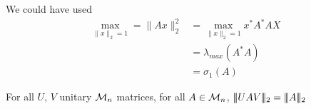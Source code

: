 \documentclass[aspectratio=169]{beamer}
\begin{document}
\begin{frame}
We could have used 
\begin{align*}
\max_{\|x\|_2=1}=\|Ax\|_2^2&= \max_{\|x\|_2=1}x^*A^*AX\\
&= \lambda_{max}(A^*A)\\
&= \sigma_1(A)
\end{align*}


\begin{remark}
	For all $U,\, V$ unitary $\mathcal{M}_{n}$ matrices, for all $A\in \mathcal{M}_n$, $\tripbar UAV\tripbar_2= \tripbar A\tripbar_2$
\end{remark}
\end{frame}
\end{document}

